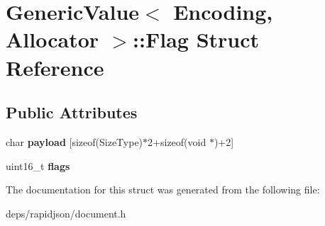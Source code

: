 \hypertarget{struct_generic_value_1_1_flag}{}\section{Generic\+Value$<$ Encoding, Allocator $>$\+:\+:Flag Struct Reference}
\label{struct_generic_value_1_1_flag}
\subsection*{Public Attributes}
\begin{DoxyCompactItemize}
\item 
char {\bfseries payload} \mbox{[}sizeof(Size\+Type)$\ast$2+sizeof(void $\ast$)+2\mbox{]}\hypertarget{struct_generic_value_1_1_flag_a87c7989d5f944abcf717e9549bc4a2d4}{}\label{struct_generic_value_1_1_flag_a87c7989d5f944abcf717e9549bc4a2d4}

\item 
uint16\+\_\+t {\bfseries flags}\hypertarget{struct_generic_value_1_1_flag_ac91f08067dcc0003fc78e870ca9b2d5d}{}\label{struct_generic_value_1_1_flag_ac91f08067dcc0003fc78e870ca9b2d5d}

\end{DoxyCompactItemize}


The documentation for this struct was generated from the following file\+:\begin{DoxyCompactItemize}
\item 
deps/rapidjson/document.\+h\end{DoxyCompactItemize}
